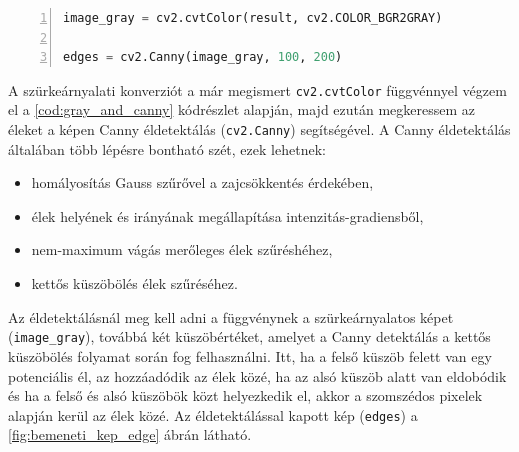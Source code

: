 \vspace{2mm}
\hspace{-10mm}
\begin{minipage}{\linewidth}
\begin{lstlisting}[language=Python, numbers=left, caption={Szürkeárnyalatolás és éldetektálás.}, label={cod:gray_and_canny}]
image_gray = cv2.cvtColor(result, cv2.COLOR_BGR2GRAY)

edges = cv2.Canny(image_gray, 100, 200)
\end{lstlisting}
\end{minipage}

\par A szürkeárnyalati konverziót a már megismert \lstinline{cv2.cvtColor} függvénnyel \cite{opencv_docs} végzem el a \ref{cod:gray_and_canny} kódrészlet alapján, majd ezután megkeressem az éleket a képen Canny éldetektálás \cite{opencv_docs, canny_edge_detection} (\lstinline{cv2.Canny}) segítségével.
\newline A Canny éldetektálás általában több lépésre bontható szét, ezek lehetnek:

\begin{itemize}
    \setlength\itemsep{-2pt}
    \item homályosítás Gauss szűrővel \cite{shapiro2001} a zajcsökkentés érdekében,
    \item élek helyének és irányának megállapítása intenzitás-gradiensből,
    \item nem-maximum vágás merőleges élek szűréshéhez,
    \item kettős küszöbölés élek szűréséhez.
\end{itemize}

\par Az éldetektálásnál meg kell adni a függvénynek a szürkeárnyalatos képet (\lstinline{image_gray}), továbbá két küszöbértéket, amelyet a Canny detektálás a kettős küszöbölés folyamat során fog felhasználni. Itt, ha a felső küszöb felett van egy potenciális él, az hozzáadódik az élek közé, ha az alsó küszöb alatt van eldobódik és ha a felső és alsó küszöbök közt helyezkedik el, akkor a szomszédos pixelek alapján kerül az élek közé. Az éldetektálással kapott kép (\lstinline{edges}) a \ref{fig:bemeneti_kep_edge} ábrán látható.

